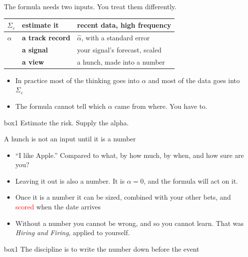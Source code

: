 \documentclass[aspectratio=169,10pt]{beamer}
\begin{document}
\begin{frame}{The formula needs two inputs. You treat them differently.}
\vskip 4pt
\begin{center}
\renewcommand{\arraystretch}{1.5}
\begin{tabular}{P{2.3cm}P{5.4cm}P{5.0cm}}
\toprule
$\Sigma_{\varepsilon}$ & \textbf{estimate it} & recent data, high frequency \\
\midrule
$\alpha$ & \textbf{a track record} & $\hat\alpha$, with a standard error \\
 & \textbf{a signal} & your signal's forecast, scaled \\
 & \textbf{a view} & a hunch, made into a number \\
\bottomrule
\end{tabular}
\end{center}
\vskip 12pt
\begin{itemize}
\item In practice most of the thinking goes into $\alpha$ and most of the data goes into $\Sigma_{\varepsilon}$
\vskip 6pt
\item The formula cannot tell which $\alpha$ came from where. You have to.
\end{itemize}
\vskip 8pt
\begin{beamercolorbox}[rounded=true,sep=7pt,center]{box1}
Estimate the risk. Supply the alpha.
\end{beamercolorbox}
\end{frame}

\begin{frame}{A hunch is not an input until it is a number}
\vskip 10pt
\begin{itemize}
\item ``I like Apple.'' Compared to what, by how much, by when, and how sure are you?
\vskip 12pt
\item Leaving it out is also a number. It is $\alpha = 0$, and the formula will act on it.
\vskip 12pt
\item Once it is a number it can be sized, combined with your other bets, and \textcolor{red}{scored} when the date arrives
\vskip 12pt
\item Without a number you cannot be wrong, and so you cannot learn. That was \emph{Hiring and Firing}, applied to yourself.
\end{itemize}
\vskip 16pt
\begin{beamercolorbox}[rounded=true,sep=7pt,center]{box1}
The discipline is to write the number down before the event
\end{beamercolorbox}
\end{frame}
\end{document}
